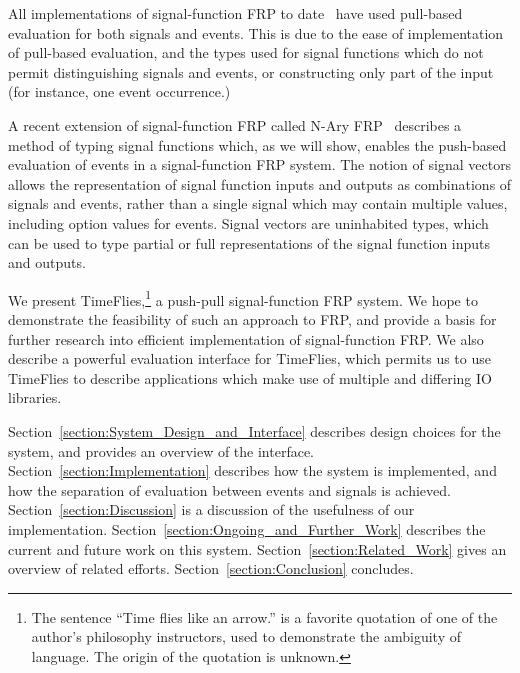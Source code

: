 All implementations of signal-function FRP to date~\cite{Courtney2001-1,Nilsson2002,Nilsson2005,Sculthorpe2011}
have used pull-based evaluation for both signals and events. This is due to
the ease of implementation of pull-based evaluation, and the types used for
signal functions which do not permit distinguishing signals and events, or
constructing only part of the input (for instance, one event occurrence.)

A recent extension of signal-function FRP called N-Ary FRP~\cite{Sculthorpe2011}
describes a method of typing signal functions which, as we will show, enables
the push-based evaluation of events in a signal-function FRP system. The notion
of signal vectors allows the representation of signal function inputs and
outputs as combinations of signals and events, rather than a single signal which
may contain multiple values, including option values for events. Signal vectors
are uninhabited types, which can be used to type partial or full representations
of the signal function inputs and outputs.

We present TimeFlies,\footnote{The sentence ``Time flies like an arrow.'' is a 
favorite quotation of one of the author's philosophy instructors, used to
demonstrate the ambiguity of language. The origin of the quotation is unknown.}
a push-pull signal-function FRP system. We hope to demonstrate the feasibility
of such an approach to FRP, and provide a basis for further research into
efficient implementation of signal-function FRP. We also describe a powerful
evaluation interface for TimeFlies, which permits us to use TimeFlies to
describe applications which make use of multiple and differing IO libraries.

Section~\ref{section:System_Design_and_Interface} describes design choices for the system,
and provides an overview of the interface. Section~\ref{section:Implementation}
describes how the system is implemented, and how the separation of evaluation
between events and signals is achieved. Section~\ref{section:Discussion} is a
discussion of the usefulness of our implementation. 
Section~\ref{section:Ongoing_and_Further_Work} describes the current and future
work on this system. Section~\ref{section:Related_Work} gives an overview of
related efforts. Section~\ref{section:Conclusion} concludes.

